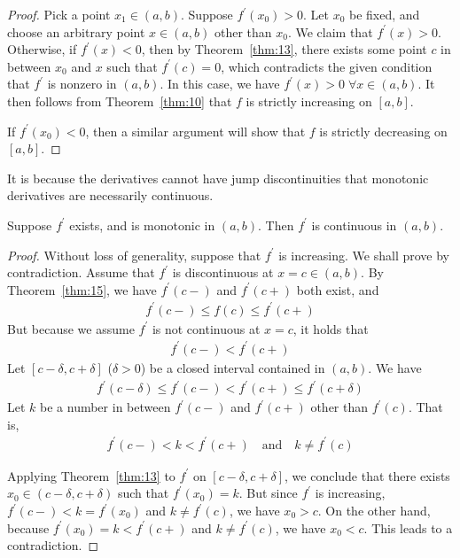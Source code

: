 \documentclass[thmcnt=section, 12pt]{my-elegantbook}
\begin{document}
\begin{proof}
    Pick a point $x_1 \in (a, b)$. Suppose $f^\prime(x_0) > 0$. Let $x_0$ be fixed, and choose an arbitrary point $x \in (a, b)$ other than $x_0$. We claim that $f^\prime(x) > 0$. Otherwise, if $f^\prime(x) < 0$, then by Theorem~\ref{thm:13}, there exists some point $c$ in between $x_0$ and $x$ such that $f^\prime(c) = 0$, which contradicts the given condition that $f^\prime$ is nonzero in $(a, b)$. In this case, we have $f^\prime(x) > 0 \; \forall x \in (a, b)$. It then follows from Theorem~\ref{thm:10} that $f$ is strictly increasing on $[a, b]$.

    \par If $f^\prime(x_0) < 0$, then a similar argument will show that $f$ is strictly decreasing on $[a, b]$.
\end{proof}


\par It is because the derivatives cannot have jump discontinuities that monotonic derivatives are necessarily continuous.

\begin{theorem}
    Suppose $f^\prime$ exists, and is monotonic in $(a, b)$. Then $f^\prime$ is continuous in $(a, b)$.
\end{theorem}

\begin{proof}
    Without loss of generality, suppose that $f^\prime$ is increasing. We shall prove by contradiction. Assume that $f^\prime$ is discontinuous at $x = c \in (a, b)$. By Theorem~\ref{thm:15}, we have $f^\prime(c-)$ and $f^\prime(c+)$ both exist, and
    \begin{align*}
        f^\prime(c-) \leq f(c) \leq f^\prime(c+)
    \end{align*}
    But because we assume $f^\prime$ is not continuous at $x = c$, it holds that
    \begin{align*}
        f^\prime(c-) < f^\prime(c+)
    \end{align*}
    Let $[c-\delta, c+\delta]$ ($\delta > 0$) be a closed interval contained in $(a, b)$. We have
    \begin{align*}
        f^\prime(c-\delta) \leq f^\prime(c-) < f^\prime(c+) \leq f^\prime(c+\delta)
    \end{align*}
    Let $k$ be a number in between $f^\prime(c-)$ and $ f^\prime(c+)$ other than $f^\prime(c)$. That is,
    \begin{align*}
        f^\prime(c-) < k < f^\prime(c+)
        \quad \text{and} \quad
        k \neq f^\prime(c)
    \end{align*}

    \par Applying Theorem~\ref{thm:13} to $f^\prime$ on $[c-\delta, c+\delta]$, we conclude that there exists $x_0 \in (c-\delta, c+\delta)$ such that $f^\prime(x_0) = k$. But since $f^\prime$ is increasing, $f^\prime(c-) < k = f^\prime(x_0)$ and $k \neq f^\prime(c)$, we have $x_0 > c$. On the other hand, because $ f^\prime(x_0) = k < f^\prime(c+) $ and $k \neq f^\prime(c)$, we have $x_0 < c$. This leads to a contradiction.
\end{proof}
\end{document}
